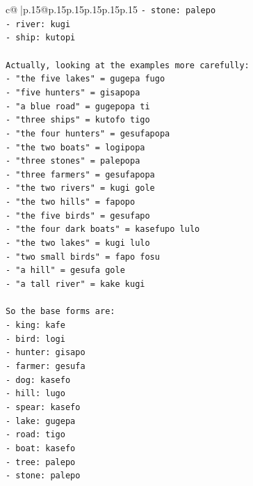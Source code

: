 \documentclass{article}
\begin{document}
{\begin{supertabular}{c@{$\;$}|p{.15\linewidth}@{}p{.15\linewidth}p{.15\linewidth}p{.15\linewidth}p{.15\linewidth}p{.15\linewidth}}
{{{\texttt{{-} stone: palepo} \\
\texttt{{-} river: kugi} \\
\texttt{{-} ship: kutopi} \\
\\ 
\texttt{Actually, looking at the examples more carefully:} \\
\texttt{{-} "the five lakes" = gugepa fugo} \\
\texttt{{-} "five hunters" = gisapopa} \\
\texttt{{-} "a blue road" = gugepopa ti} \\
\texttt{{-} "three ships" = kutofo tigo} \\
\texttt{{-} "the four hunters" = gesufapopa} \\
\texttt{{-} "the two boats" = logipopa} \\
\texttt{{-} "three stones" = palepopa} \\
\texttt{{-} "three farmers" = gesufapopa} \\
\texttt{{-} "the two rivers" = kugi gole} \\
\texttt{{-} "the two hills" = fapopo} \\
\texttt{{-} "the five birds" = gesufapo} \\
\texttt{{-} "the four dark boats" = kasefupo lulo} \\
\texttt{{-} "the two lakes" = kugi lulo} \\
\texttt{{-} "two small birds" = fapo fosu} \\
\texttt{{-} "a hill" = gesufa gole} \\
\texttt{{-} "a tall river" = kake kugi} \\
\\ 
\texttt{So the base forms are:} \\
\texttt{{-} king: kafe} \\
\texttt{{-} bird: logi} \\
\texttt{{-} hunter: gisapo} \\
\texttt{{-} farmer: gesufa} \\
\texttt{{-} dog: kasefo} \\
\texttt{{-} hill: lugo} \\
\texttt{{-} spear: kasefo} \\
\texttt{{-} lake: gugepa} \\
\texttt{{-} road: tigo} \\
\texttt{{-} boat: kasefo} \\
\texttt{{-} tree: palepo} \\
\texttt{{-} stone: palepo} \\
}}}
\end{supertabular}}
\end{document}
